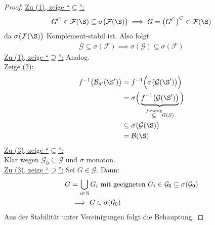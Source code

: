 \begin{proof}\enter
\underline{Zu (1), zeige ``$\subseteq$'':}
\begin{align*}
G^C\in\mathcal{F}(\S)\subseteq\sigma\big(\mathcal{F}(\S)\big)
\implies
G=\big(G^C\big)^C\in\mathcal{F}(\S)
\end{align*}
da $\sigma\big(\mathcal{F}(\S)\big)$ Komplement-stabil ist. Also folgt
\begin{align*}
\mathcal{G}\subseteq\sigma(\mathcal{F})
\implies\sigma(\mathcal{G})\subseteq\sigma(\mathcal{F})
\end{align*}
\underline{Zu (1), zeige ``$\supseteq$'':} Analog.\\

\underline{Zeige (2):}
\begin{align*}
f^{-1}\big(\B_{d'}(\S')\big)&=f^{-1}\Big(\sigma\big(\mathcal{G}(\S')\big)\Big)\\
&=\sigma\Big(\underbrace{f^{-1}\big(\mathcal{G}(\S')\big)}_{\stackrel{f\text{ stetig}}{\subseteq}\mathcal{G}(S)}\Big)\\
&\subseteq\sigma\big(\mathcal{G}(\S)\big)\\
&=\B(\S)
\end{align*}
\underline{Zu (3), zeige ``$\subseteq$'':}\\
Klar wegen $\mathcal{G}_0\subseteq\mathcal{G}$ und $\sigma$ monoton.\\
\underline{Zu (3), zeige ``$\supseteq$'':} Sei $G\in\mathcal{G}$. Dann:
\begin{align*}
G&=\bigcup\limits_{i\in\mathbb{N}} G_i\text{ mit }\text{geeigneten }G_i\in\mathcal{G}_0\subseteq\sigma(\mathcal{G}_0)\\
&\implies
G\in\sigma(\mathcal{G}_0)
\end{align*}
Aus der Stabilität unter Vereinigungen folgt die Behauptung.
\end{proof}

